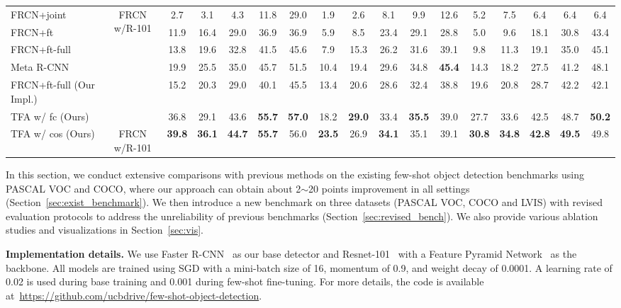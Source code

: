 \documentclass{article}
\newcommand{\model}{TFA\xspace}
\newcommand\minisection[1]{\vspace{1mm}\noindent \textbf{#1}}
\begin{document}
\begin{table*}[ht]
{\begin{tabular}{l|c|ccccc|ccccc|ccccc}
FRCN+joint~\cite{yan2019meta} & \multirow{4}{*}{FRCN w/R-101} & 2.7 & 3.1 & 4.3 & 11.8 & 29.0 & 1.9 & 2.6 & 8.1 & 9.9 & 12.6 & 5.2 & 7.5 & 6.4 & 6.4 & 6.4 \\
FRCN+ft~\cite{yan2019meta} &  & 11.9 & 16.4 & 
29.0 & 36.9 & 36.9 & 5.9 & 8.5 & 23.4 & 29.1 & 28.8 & 5.0 & 9.6 & 18.1 & 30.8 & 43.4 \\
FRCN+ft-full~\cite{yan2019meta} &  & 13.8 & 19.6 
& 32.8 & 41.5 & 45.6 & 7.9 & 15.3 & 26.2 & 31.6 & 39.1 & 9.8 & 11.3 & 19.1 & 35.0 & 45.1 \\
Meta R-CNN~\cite{yan2019meta} &  & 19.9 & 25.5 & 35.0 & 45.7 & 51.5 & 10.4 & 19.4 & 29.6 & 34.8 & \textbf{45.4} & 14.3 & 18.2 & 27.5 & 41.2 & 48.1 \\ \midrule
FRCN+ft-full (Our Impl.) &  & 15.2 & 20.3 & 29.0 & 40.1 & 45.5 & 13.4 & 20.6 & 28.6 & 32.4 & 38.8 & 19.6 & 20.8 & 28.7 & 42.2 & 42.1 \\
\rowcolor{Gray} \model w/ fc (Ours) &  & 36.8 & 29.1 & 43.6 & \textbf{55.7} & \textbf{57.0} & 18.2 & \textbf{29.0} & 33.4 & \textbf{35.5} & 39.0 & 27.7 & 33.6 & 42.5 & 48.7 & \textbf{50.2} \\
\rowcolor{Gray} \model w/ cos (Ours) & \multirow{-3}{*}{FRCN w/R-101} & \textbf{39.8} & \textbf{36.1} & \textbf{44.7} & \textbf{55.7} & 56.0 & \textbf{23.5} & 26.9 & \textbf{34.1} & 35.1 & 39.1 & \textbf{30.8} & \textbf{34.8} & \textbf{42.8} & \textbf{49.5} & 49.8 \\
\bottomrule
\end{tabular}}
\label{tab:main_voc}
\end{table*}
In this section, we conduct extensive comparisons with previous methods on the existing 
few-shot object detection benchmarks using PASCAL VOC and COCO, where our approach can obtain
about 2$\sim$20 points improvement in all settings (Section~\ref{sec:exist_benchmark}). We then introduce a new benchmark on three datasets (PASCAL VOC, COCO and LVIS) with revised evaluation protocols to address the unreliability of previous benchmarks (Section~\ref{sec:revised_bench}). We also provide various ablation studies and visualizations in Section~\ref{sec:vis}. 

\minisection{Implementation details.}
We use Faster R-CNN~\cite{ren2015faster} as our base detector and Resnet-101~\cite{he2016deep} with a Feature Pyramid Network~\cite{lin2016feature} as the backbone.
All models are trained using SGD with a mini-batch size of 16, momentum of 0.9, and weight decay of 0.0001.
A learning rate of 0.02 is used during base training and 0.001 during few-shot fine-tuning.
For more details, the code is available at~\url{https://github.com/ucbdrive/few-shot-object-detection}.
\end{document}
